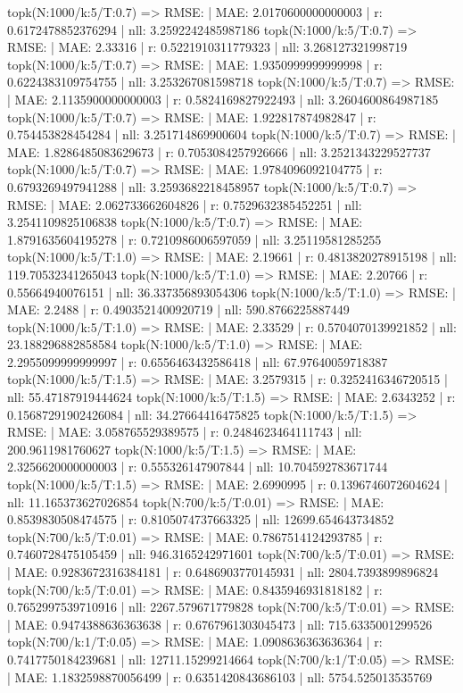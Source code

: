 topk(N:1000/k:5/T:0.7) => RMSE: | MAE: 2.0170600000000003 | r: 0.6172478852376294 | nll: 3.2592242485987186
topk(N:1000/k:5/T:0.7) => RMSE: | MAE: 2.33316 | r: 0.5221910311779323 | nll: 3.268127321998719
topk(N:1000/k:5/T:0.7) => RMSE: | MAE: 1.9350999999999998 | r: 0.6224383109754755 | nll: 3.253267081598718
topk(N:1000/k:5/T:0.7) => RMSE: | MAE: 2.1135900000000003 | r: 0.5824169827922493 | nll: 3.2604600864987185
topk(N:1000/k:5/T:0.7) => RMSE: | MAE: 1.922817874982847 | r: 0.754453828454284 | nll: 3.251714869900604
topk(N:1000/k:5/T:0.7) => RMSE: | MAE: 1.8286485083629673 | r: 0.7053084257926666 | nll: 3.2521343229527737
topk(N:1000/k:5/T:0.7) => RMSE: | MAE: 1.9784096092104775 | r: 0.6793269497941288 | nll: 3.2593682218458957
topk(N:1000/k:5/T:0.7) => RMSE: | MAE: 2.062733662604826 | r: 0.7529632385452251 | nll: 3.2541109825106838
topk(N:1000/k:5/T:0.7) => RMSE: | MAE: 1.8791635604195278 | r: 0.7210986006597059 | nll: 3.25119581285255
topk(N:1000/k:5/T:1.0) => RMSE: | MAE: 2.19661 | r: 0.4813820278915198 | nll: 119.70532341265043
topk(N:1000/k:5/T:1.0) => RMSE: | MAE: 2.20766 | r: 0.55664940076151 | nll: 36.337356893054306
topk(N:1000/k:5/T:1.0) => RMSE: | MAE: 2.2488 | r: 0.4903521400920719 | nll: 590.8766225887449
topk(N:1000/k:5/T:1.0) => RMSE: | MAE: 2.33529 | r: 0.5704070139921852 | nll: 23.188296882858584
topk(N:1000/k:5/T:1.0) => RMSE: | MAE: 2.2955099999999997 | r: 0.6556463432586418 | nll: 67.97640059718387
topk(N:1000/k:5/T:1.5) => RMSE: | MAE: 3.2579315 | r: 0.3252416346720515 | nll: 55.47187919444624
topk(N:1000/k:5/T:1.5) => RMSE: | MAE: 2.6343252 | r: 0.15687291902426084 | nll: 34.27664416475825
topk(N:1000/k:5/T:1.5) => RMSE: | MAE: 3.058765529389575 | r: 0.2484623464111743 | nll: 200.9611981760627
topk(N:1000/k:5/T:1.5) => RMSE: | MAE: 2.3256620000000003 | r: 0.555326147907844 | nll: 10.704592783671744
topk(N:1000/k:5/T:1.5) => RMSE: | MAE: 2.6990995 | r: 0.1396746072604624 | nll: 11.165373627026854
topk(N:700/k:5/T:0.01) => RMSE: | MAE: 0.8539830508474575 | r: 0.8105074737663325 | nll: 12699.654643734852
topk(N:700/k:5/T:0.01) => RMSE: | MAE: 0.7867514124293785 | r: 0.7460728475105459 | nll: 946.3165242971601
topk(N:700/k:5/T:0.01) => RMSE: | MAE: 0.9283672316384181 | r: 0.6486903770145931 | nll: 2804.7393899896824
topk(N:700/k:5/T:0.01) => RMSE: | MAE: 0.8435946931818182 | r: 0.7652997539710916 | nll: 2267.579671779828
topk(N:700/k:5/T:0.01) => RMSE: | MAE: 0.9474388636363638 | r: 0.6767961303045473 | nll: 715.6335001299526
topk(N:700/k:1/T:0.05) => RMSE: | MAE: 1.0908636363636364 | r: 0.7417750184239681 | nll: 12711.15299214664
topk(N:700/k:1/T:0.05) => RMSE: | MAE: 1.1832598870056499 | r: 0.6351420843686103 | nll: 5754.525013535769
